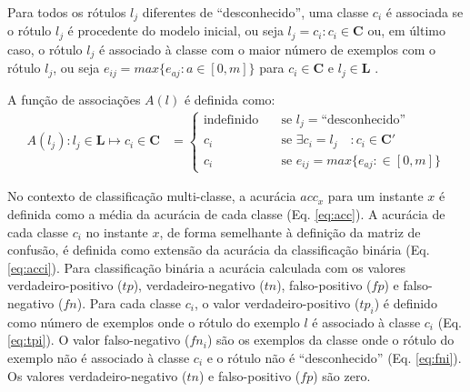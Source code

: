 Para todos os rótulos $l_j$ diferentes de ``desconhecido'', uma classe $c_i$ é
associada se o rótulo $l_j$ é procedente do modelo inicial, ou seja $l_j = c_i :
c_i \in \mathbf{C}$ ou, em último caso, o rótulo $l_j$ é associado à classe com
o maior número de exemplos com o rótulo $l_j$, ou seja $e_{ij} = max\{ e_{aj} :
a \in [0, m] \}$ para $c_i \in \mathbf{C}$ e $l_j \in \mathbf{L}$
\cite{Faria2013evaluation}.

\begin{definition}
  A função de associações $A(l)$ é definida como:
  \begin{align}
    A(l_j) : l_j \in \mathbf{L} \mapsto c_i \in \mathbf{C} &= \begin{cases} 
      \text{indefinido}        & \quad \text{se } l_j = \text{``desconhecido''} \\
      c_i         & \quad \text{se } \exists c_i = l_j \quad: c_i \in \mathbf{C}' \\
      c_i         & \quad \text{se } e_{ij} = max\{ e_{aj} : \in [0, m] \}
    \end{cases}
  \end{align}
\end{definition}

No contexto de classificação multi-classe, a acurácia $\mathit{acc}_x$ para um
instante $x$ é definida como a média da acurácia de cada classe (Eq. \ref{eq:acc}).
A acurácia de cada classe $c_i$ no instante $x$, de forma semelhante à
definição da matriz de confusão, é definida como extensão da acurácia da
classificação binária (Eq. \ref{eq:acci}).
Para classificação binária a acurácia calculada com os valores
verdadeiro-positivo ($tp$), verdadeiro-negativo ($tn$), falso-positivo ($fp$) e
falso-negativo ($fn$).
Para cada classe $c_i$, o valor verdadeiro-positivo ($tp_i$) é definido como
número de exemplos onde o rótulo do exemplo $l$ é associado à
classe $c_i$ (Eq. \ref{eq:tpi}).
O valor falso-negativo ($fn_i$) são os exemplos da classe onde o
rótulo do exemplo não é associado à classe $c_i$ e o rótulo não é ``desconhecido'' (Eq. \ref{eq:fni}).
Os valores verdadeiro-negativo ($tn$) e falso-positivo ($fp$) são zero.

